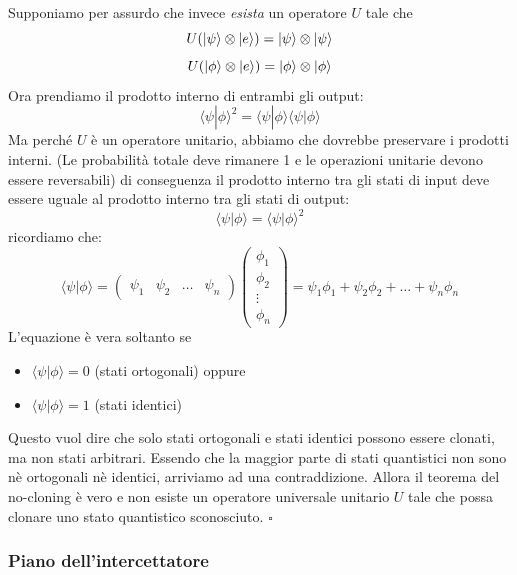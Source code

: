 \documentclass[a4paper]{article}
\begin{document}
Supponiamo per assurdo che invece \textit{esista} un operatore $U$ tale che
\[U(\ket{\psi} \otimes \ket{e}) = \ket{\psi} \otimes \ket{\psi}\]
\[U(\ket{\phi} \otimes \ket{e}) = \ket{\phi} \otimes \ket{\phi}\]
Ora prendiamo il prodotto interno di entrambi gli output:
\[
\langle \psi | \phi \rangle^2 = \langle \psi | \phi \rangle  \langle \psi | \phi \rangle
\]
Ma perché $U$ è un operatore unitario, abbiamo che dovrebbe preservare i prodotti interni.
(Le probabilità totale deve rimanere 1 e le operazioni unitarie devono essere reversabili)
di conseguenza il prodotto interno tra gli stati di input deve essere uguale al prodotto interno tra gli stati di output:
\[\langle \psi | \phi \rangle = \langle \psi | \phi \rangle^2 \]
ricordiamo che:
\[\langle \psi | \phi \rangle = \begin{pmatrix}
  \psi_1 & \psi_2 & \dots & \psi_n 
\end{pmatrix} \begin{pmatrix}
  \phi_1 \\
  \phi_2 \\
  \vdots \\
  \phi_n
\end{pmatrix} = \psi_1\phi_1 + \psi_2\phi_2 + \dots + \psi_n\phi_n\]
L'equazione è vera soltanto se 
\begin{itemize}
  \item $\langle \psi | \phi \rangle = 0$ (stati ortogonali) oppure
  \item $\langle \psi | \phi \rangle = 1$ (stati identici)
\end{itemize}
Questo vuol dire che solo stati ortogonali e stati identici possono essere clonati, ma non stati arbitrari.
Essendo che la maggior parte di stati quantistici non sono nè ortogonali nè identici, arriviamo ad una contraddizione.
Allora il teorema del no-cloning è vero e non esiste un operatore universale unitario $U$ tale che possa clonare uno stato quantistico sconosciuto. $\square$

\subsubsection{Piano dell'intercettatore}
\end{document}
